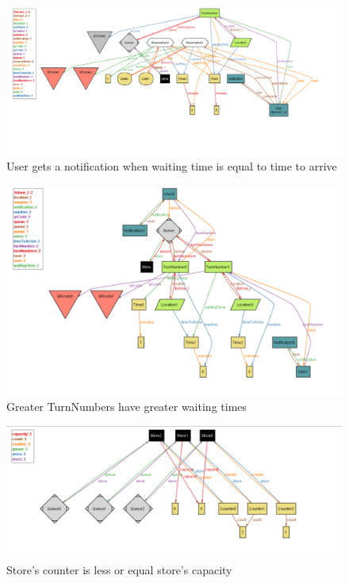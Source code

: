 \documentclass{article}
\begin{document}
\begin{figure}[H]
  \includegraphics[width=\linewidth]{yesNotification}
  \caption{User gets a notification when waiting time is equal to time to arrive}
  
\end{figure}

\begin{figure}[H]
  \includegraphics[width=\linewidth]{waitingTime}
  \caption{Greater TurnNumbers have greater waiting times}
  
\end{figure}

\begin{figure}[H]
  \includegraphics[width=\linewidth]{storeCapacity}
  \caption{Store's counter is less or equal store's capacity}
  
\end{figure}
\end{document}

